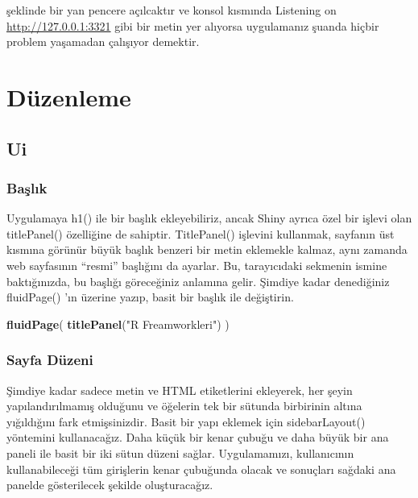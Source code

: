\documentclass[]{book}
\newenvironment{Shaded}{\begin{snugshade}}{\end{snugshade}}
\newcommand{\KeywordTok}[1]{\textcolor[rgb]{0.13,0.29,0.53}{\textbf{#1}}}
\newcommand{\StringTok}[1]{\textcolor[rgb]{0.31,0.60,0.02}{#1}}
\newcommand{\NormalTok}[1]{#1}
\begin{document}
şeklinde bir yan pencere açılcaktır ve konsol kısmında {Listening on
\url{http://127.0.0.1:3321}} gibi bir metin yer alıyorsa uygulamanız
şuanda hiçbir problem yaşamadan çalışıyor demektir.

\section{Düzenleme}\label{duzenleme-1}

\subsection{Ui}\label{ui}

\subsubsection{Başlık}\label{baslk-1}

Uygulamaya h1() ile bir başlık ekleyebiliriz, ancak Shiny ayrıca özel
bir işlevi olan titlePanel() özelliğine de sahiptir. TitlePanel()
işlevini kullanmak, sayfanın üst kısmına görünür büyük başlık benzeri
bir metin eklemekle kalmaz, aynı zamanda web sayfasının ``resmi''
başlığını da ayarlar. Bu, tarayıcıdaki sekmenin ismine baktığınızda, bu
başlığı göreceğiniz anlamına gelir. Şimdiye kadar denediğiniz
fluidPage() 'ın üzerine yazıp, basit bir başlık ile değiştirin.

\begin{Shaded}
\begin{Highlighting}[]
\KeywordTok{fluidPage}\NormalTok{(}
  \KeywordTok{titlePanel}\NormalTok{(}\StringTok{"R Freamworkleri"}\NormalTok{)}
\NormalTok{)}
\end{Highlighting}
\end{Shaded}

\subsubsection{Sayfa Düzeni}\label{sayfa-duzeni}

Şimdiye kadar sadece metin ve HTML etiketlerini ekleyerek, her şeyin
yapılandırılmamış olduğunu ve öğelerin tek bir sütunda birbirinin altına
yığıldığını fark etmişsinizdir. Basit bir yapı eklemek için
sidebarLayout() yöntemini kullanacağız. Daha küçük bir kenar çubuğu ve
daha büyük bir ana paneli ile basit bir iki sütun düzeni sağlar.
Uygulamamızı, kullanıcının kullanabileceği tüm girişlerin kenar
çubuğunda olacak ve sonuçları sağdaki ana panelde gösterilecek şekilde
oluşturacağız.
\end{document}
